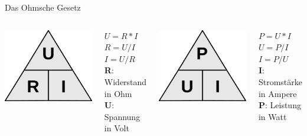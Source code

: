 \begin{frame}{Das Ohmsche Gesetz}
    \begin{columns}
        \includegraphics[width=.5\textwidth]{2-hardwaredesign/img/formel_uri}

        \bigskip

        $U = R * I$ \\
        \smallskip
        $R = U / I$ \\
        \smallskip
        $I = U / R$ \\

        \bigskip
        {
            \footnotesize
            \textbf{R}: Widerstand in Ohm \\
            \smallskip
            \textbf{U}: Spannung in Volt \\
        }

        \includegraphics[width=.5\textwidth]{2-hardwaredesign/img/formel_pui}

        \bigskip

        $P = U * I$ \\
        \smallskip
        $U = P / I$ \\
        \smallskip
        $I = P / U$ \\

        \bigskip
        {
            \footnotesize
            \textbf{I}: Stromstärke in Ampere\\
            \smallskip
            \textbf{P}: Leistung in Watt \\
        }
    \end{columns}


\end{frame}
